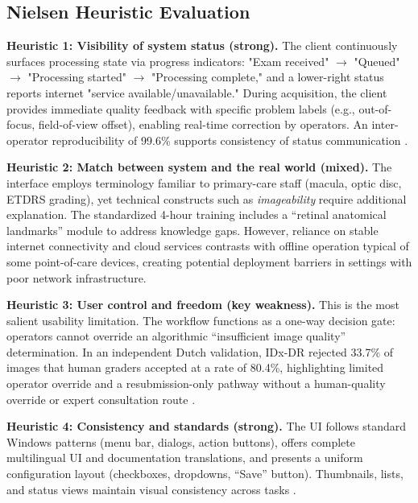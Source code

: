 \documentclass[sigconf]{acmart}
\begin{document}
\subsection{Nielsen Heuristic Evaluation}

\textbf{Heuristic 1: Visibility of system status (strong).} The client continuously surfaces processing state via progress indicators: "Exam received" $\rightarrow$ "Queued" $\rightarrow$ "Processing started" $\rightarrow$ "Processing complete," and a lower\mbox{-}right status reports internet "service available\slash unavailable." During acquisition, the client provides immediate quality feedback with specific problem labels (e.g., out\mbox{-}of\mbox{-}focus, field\mbox{-}of\mbox{-}view offset), enabling real\mbox{-}time correction by operators. An inter\mbox{-}operator reproducibility of 99.6\% supports consistency of status communication \citep{FDA2018DEN180001}.

\textbf{Heuristic 2: Match between system and the real world (mixed).} The interface employs terminology familiar to primary\mbox{-}care staff (macula, optic disc, ETDRS grading), yet technical constructs such as \textit{imageability} require additional explanation. The standardized 4\mbox{-}hour training includes a “retinal anatomical landmarks” module to address knowledge gaps. However, reliance on stable internet connectivity and cloud services contrasts with offline operation typical of some point\mbox{-}of\mbox{-}care devices, creating potential deployment barriers in settings with poor network infrastructure.

\textbf{Heuristic 3: User control and freedom (key weakness).} This is the most salient usability limitation. The workflow functions as a one\mbox{-}way decision gate: operators cannot override an algorithmic “insufficient image quality” determination. In an independent Dutch validation, IDx\mbox{-}DR rejected 33.7\% of images that human graders accepted at a rate of 80.4\%, highlighting limited operator override and a resubmission\mbox{-}only pathway without a human\mbox{-}quality override or expert consultation route \citep{vanDerHeijden2018Acta}.

\textbf{Heuristic 4: Consistency and standards (strong).} The UI follows standard Windows patterns (menu bar, dialogs, action buttons), offers complete multilingual UI and documentation translations, and presents a uniform configuration layout (checkboxes, dropdowns, “Save” button). Thumbnails, lists, and status views maintain visual consistency across tasks \citep{FDA2018DEN180001}.
\end{document}

